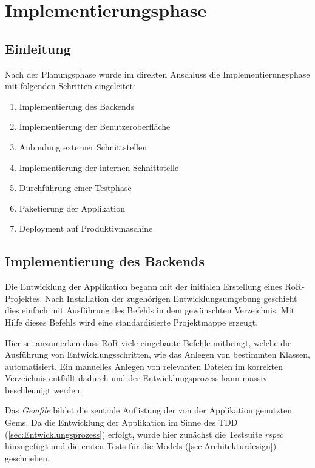 \section{Implementierungsphase}
\label{sec:Implementierungsphase}

\subsection{Einleitung}
\label{sec:Einleitung}
Nach der Planungsphase wurde im direkten Anschluss die Implementierungsphase mit folgenden Schritten
eingeleitet:
\begin{enumerate}
	\item Implementierung des Backends
	\item Implementierung der Benutzeroberfläche
	\item Anbindung externer Schnittstellen
	\item Implementierung der internen Schnittstelle
	\item Durchführung einer Testphase
	\item Paketierung der Applikation
	\item Deployment auf Produktivmaschine
\end{enumerate}

\subsection{Implementierung des Backends}
\label{sec:Implementierung des Backends}
Die Entwicklung der Applikation begann mit der initialen Erstellung eines \acs{RoR}-Projektes.
Nach Installation der zugehörigen Entwicklungsumgebung geschieht dies einfach mit Ausführung des
Befehls  in dem gewünschten Verzeichnis. Mit Hilfe dieses Befehls wird eine
standardisierte Projektmappe erzeugt.

Hier sei anzumerken dass RoR viele eingebaute Befehle mitbringt, welche die Ausführung von
Entwicklungsschritten, wie \bspw das Anlegen von bestimmten Klassen, automatisiert. Ein manuelles
Anlegen von relevanten Dateien im korrekten Verzeichnis entfällt dadurch und der Entwicklungsprozess
kann massiv beschleunigt werden.

Das \textit{Gemfile} bildet die zentrale Auflistung der von der Applikation genutzten Gems. Da die
Entwicklung der Applikation im Sinne des \acs{TDD} (\Vgl \ref{sec:Entwicklungsprozess}) erfolgt,
wurde hier zunächst die Testsuite \textit{rspec} hinzugefügt und die ersten Tests für die Models
(\Vgl \ref{sec:Architekturdesign}) geschrieben.

